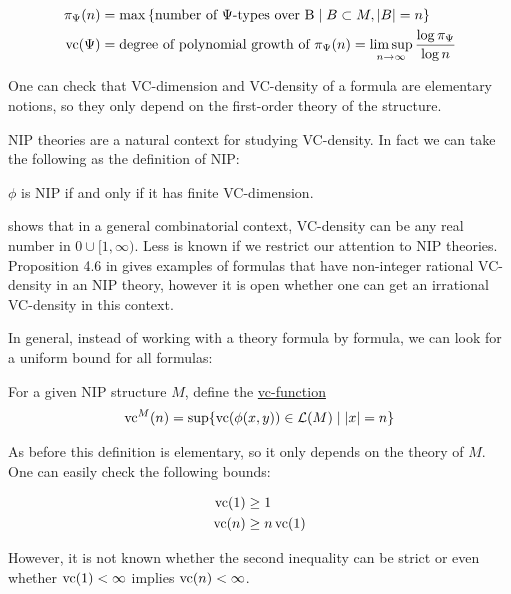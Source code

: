 \documentclass{amsart}
\renewcommand{\LL}{\mathcal L}
\newcommand{\curly}[1]{\left\{#1\right\}}
\newcommand{\defn}{\underline}
\begin{document}
\begin{Definition}
  \begin{align*}
    \pi_\Psi(n) &= \max \curly{\text{number of $\Psi$-types over B} \mid B \subset M, |B| = n} \\
    \vc(\Psi) &= \text{degree of polynomial growth of $\pi_\Psi(n)$}  = \limsup_{n \to \infty}\frac{\log \pi_\Psi}{\log n}
  \end{align*}
\end{Definition}  

One can check that VC-dimension and VC-density of a formula are elementary notions,
so they only depend on the first-order theory of the structure.

NIP theories are a natural context for studying VC-density.
In fact we can take the following as the definition of NIP:
\begin{Lemma}
  $\phi$ is NIP if and only if it has finite VC-dimension. 
\end{Lemma}

\cite{Aschenbrenner_reference_8} shows that in a general combinatorial context,
VC-density can be any real number in $0 \cup [1, \infty)$.
Less is known if we restrict our attention to NIP theories.
Proposition 4.6 in \cite{density} gives examples of formulas that have non-integer rational VC-density in an NIP theory,
however it is open whether one can get an irrational VC-density in this context.

In general, instead of working with a theory formula by formula, we can look for a uniform bound for all formulas:
\begin{Definition}
  For a given NIP structure $M$, define the \defn{vc-function}
  \begin{align*}
    \vc^M(n) = \sup \{\vc(\phi(x, y)) \in \LL(M) \mid |x| = n\}
  \end{align*}
\end{Definition}

As before this definition is elementary, so it only depends on the theory of $M$.
One can easily check the following bounds:
\begin{Lemma} 
  \begin{align*}
    \operatorname{vc}(1) &\geq 1 \\
    \operatorname{vc}(n) &\geq n\operatorname{vc}(1)
  \end{align*}  
\end{Lemma}

However, it is not known whether the second inequality can be strict or even whether $\operatorname{vc}(1) < \infty$ implies $\operatorname{vc}(n) < \infty$.
\end{document}
